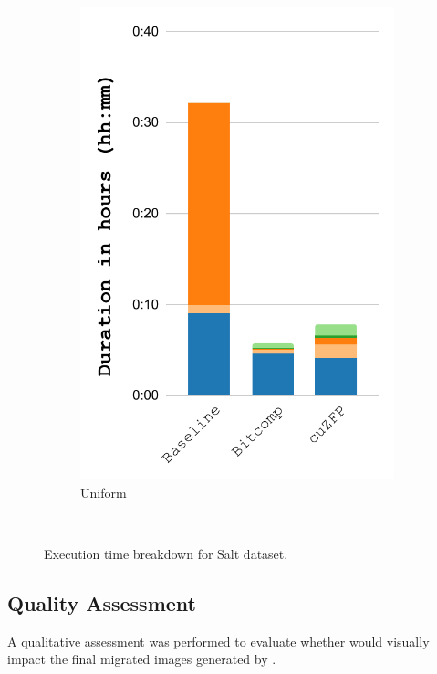 \documentclass[Ingles]{ic-tese-v3}
\begin{document}
\begin{figure}[h!]
\begin{subfigure}{0.3\textwidth}
        \includegraphics[width=\textwidth,trim={0 0 0 0},clip]{figures/compress_breakdown/breakdown_compress_salt_uniform.pdf}
        \caption{Uniform}
        \label{fig:compress_breakdown_uniform}
    \end{subfigure}\\
    \caption[Execution time breakdown (\compression)]{Execution time breakdown for Salt dataset.}
    \label{fig:compress_breakdown}
\end{figure}

\subsection{Quality Assessment}
\label{sec:quality}

A qualitative assessment was performed to evaluate whether \compression would visually impact the final migrated images generated by \awave. 
\end{document}
